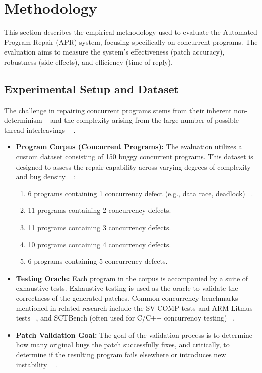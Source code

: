 \section{Methodology} \label{sec:methodology}
This section describes the empirical methodology used to evaluate the Automated Program Repair (APR) system, focusing specifically on concurrent programs. The evaluation aims to measure the system's effectiveness (patch accuracy), robustness (side effects), and efficiency (time of reply).
\subsection{Experimental Setup and Dataset} \label{subsec:dataset}
The challenge in repairing concurrent programs stems from their inherent non-determinism ~\cite{yu2018,chang2021}
 and the complexity arising from the large number of possible thread interleavings ~\cite{abbaspour2016}
.
\begin{itemize} \item \textbf{Program Corpus (Concurrent Programs):} The evaluation utilizes a custom dataset consisting of 150 buggy concurrent programs. This dataset is designed to assess the repair capability across varying degrees of complexity and bug density ~\cite{yu2018}
: \begin{enumerate} \item 6 programs containing 1 concurrency defect (e.g., data race, deadlock) ~\cite{jain2025,liu2021_2}. \item 11 programs containing 2 concurrency defects. \item 11 programs containing 3 concurrency defects. \item 10 programs containing 4 concurrency defects.\item 6 programs containing 5 concurrency defects. \end{enumerate} \item \textbf{Testing Oracle:} Each program in the corpus is accompanied by a suite of exhaustive tests. Exhaustive testing is used as the oracle to validate the correctness of the generated patches. Common concurrency benchmarks mentioned in related research include the SV-COMP  tests and ARM Litmus tests ~\cite{yang2023,jain2025}, and SCTBench (often used for C/C++ concurrency testing) ~\cite{anand2024}. \item \textbf{Patch Validation Goal:} The goal of the validation process is to determine how many original bugs the patch successfully fixes, and critically, to determine if the resulting program fails elsewhere or introduces new instability ~\cite{liyanage2025}
. \end{itemize}

